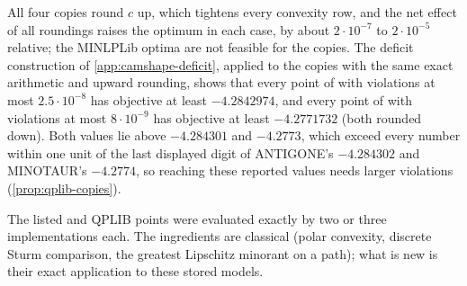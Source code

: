 All four copies round $c$ up, which tightens every convexity row, and the net effect of all roundings raises the optimum in each case, by about $2\cdot10^{-7}$ to $2\cdot10^{-5}$ relative; the MINLPLib optima are not feasible for the copies.
The deficit construction of \cref{app:camshape-deficit}, applied to the copies with the same exact arithmetic and upward rounding, shows that every point of  with violations at most $2.5\cdot10^{-8}$ has objective at least $-4.2842974$, and every point of  with violations at most $8\cdot10^{-9}$ has objective at least $-4.2771732$ (both rounded down).
Both values lie above $-4.284301$ and $-4.2773$, which exceed every number within one unit of the last displayed digit of ANTIGONE's $-4.284302$ and MINOTAUR's $-4.2774$, so reaching these reported values needs larger violations (\cref{prop:qplib-copies}).

The listed and QPLIB points were evaluated exactly by two or three implementations each.
The ingredients are classical (polar convexity, discrete Sturm comparison, the greatest Lipschitz minorant on a path); what is new is their exact application to these stored models.
